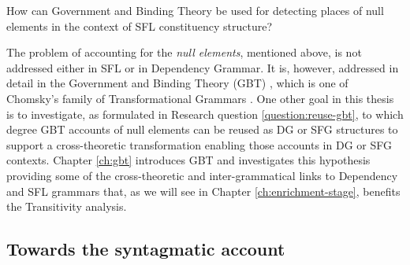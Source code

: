 \begin{question}\label{question:reuse-gbt}
    How can Government and Binding Theory be used for detecting places of null elements in the context of SFL constituency structure?
\end{question}


The problem of accounting for the \textit{null elements}, mentioned above, is not addressed either in SFL or in Dependency Grammar. It is, however, addressed in detail in the Government and Binding Theory (GBT) \citep{Chomsky81,Haegeman1991}, which is one of Chomsky's family of Transformational Grammars \citep{ Chomsky57}. One other goal in this thesis is to investigate, as formulated in Research question \ref{question:reuse-gbt}, to which degree GBT accounts of null elements can be reused as DG or SFG structures to support a cross-theoretic transformation enabling those accounts in DG or SFG contexts. Chapter \ref{ch:gbt} introduces GBT and investigates this hypothesis providing some of the cross-theoretic and inter-grammatical links to Dependency and SFL grammars that, as we will see in Chapter \ref{ch:enrichment-stage}, benefits the Transitivity analysis.


\subsection{Towards the syntagmatic account}
\label{sec:syntagmatic-account}


